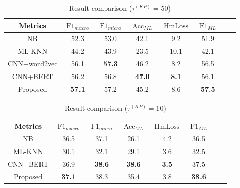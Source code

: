 \begin{table}
    \centering
    \caption{Result comparison (\(\tau^{(KP)}=50 \))}\label{tbl:bsline3}
    \begin{tabular}{cccccccc}
        \toprule
        Metrics      & \(\operatorname{F1}_{macro}\) & \(\operatorname{F1}_{micro}\) & \(\operatorname{Acc}_{ML}\) & \(\operatorname{HmLoss}\) & \(\operatorname{F1}_{ML}\) \\
        \midrule
        NB           & 52.3                          & 53.0                          & 42.1                        & 9.2                       & 51.9                       \\
        ML-KNN       & 44.2                          & 43.9                          & 23.5                        & 10.1                      & 42.1                       \\
        CNN+word2vec & 56.1                          & \textbf{57.3}                 & 46.2                        & 8.2                       & 56.5                       \\
        CNN+BERT     & 56.2                          & 56.8                          & \textbf{47.0}               & \textbf{8.1}              & 56.1                       \\
        Proposed     & \textbf{57.1}                 & 57.2                          & 45.2                        & 8.6                       & \textbf{57.5}              \\
        \bottomrule
    \end{tabular}
\end{table}

\begin{table}
    \centering
    \caption{Result comparison (\(\tau^{(KP)}=10 \))}\label{tbl:bsline4}
    \begin{tabular}{cccccccc}
        \toprule
        Metrics  & \(\operatorname{F1}_{macro}\) & \(\operatorname{F1}_{micro}\) & \(\operatorname{Acc}_{ML}\) & \(\operatorname{HmLoss}\) & \(\operatorname{F1}_{ML}\) \\
        \midrule
        NB       & 36.5                          & 37.1                          & 26.1                        & 4.2                       & 36.5                       \\
        ML-KNN   & 30.1                          & 32.1                          & 29.1                        & 3.6                       & 32.5                       \\
        CNN+BERT & 36.9                          & \textbf{38.6}                 & \textbf{38.6}               & \textbf{3.5}              & 37.5                       \\
        Proposed & \textbf{37.1}                 & 38.3                          & 35.4                        & 3.8                       & \textbf{38.6}              \\
        \bottomrule
    \end{tabular}
\end{table}

